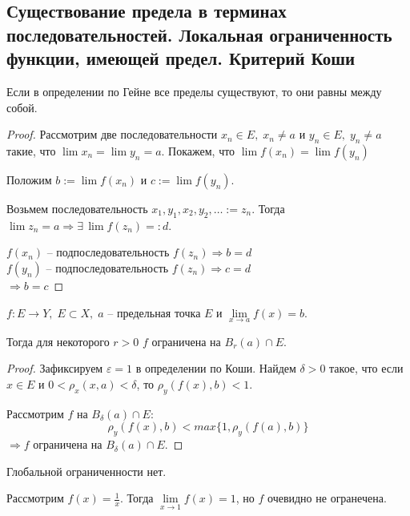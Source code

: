 \subsection{Существование предела в терминах последовательностей. Локальная ограниченность функции, имеющей предел. Критерий Коши \href{https://youtu.be/BiTNBigkkyU?t=2205}{\Walley}}

\begin{theorem-non}
    Если в определении по Гейне все пределы существуют, то они равны между собой. 
\end{theorem-non}
\begin{proof}
    Рассмотрим две последовательности $x_n \in E, \; x_n \neq a$ и $y_n \in E, \; y_n \neq a$ такие, что $\lim x_n = \lim y_n = a$. Покажем, что $\lim f(x_n) = \lim f(y_n)$
    
    Положим $b := \lim f(x_n)$ и $c := \lim f(y_n)$.

    Возьмем последовательность $x_1, y_1, x_2, y_2, \dots := z_n$. Тогда $\lim z_n = a \Rightarrow \exists \, \lim f(z_n) =: d$.
    
    $f(x_n)$ -- подпоследовательность $f(z_n) \Rightarrow b = d$ \\
    $f(y_n)$ -- подпоследовательность $f(z_n) \Rightarrow c = d$ \\
    $\Rightarrow b = c$
\end{proof}

\begin{theorem-non}
    $f : E \to Y, \; E \subset X, \; a$ -- предельная точка $E$ и $\lim\limits_{x \to a} f(x) = b$. 

    Тогда для некоторого $r > 0$ $f$ ограничена на $B_r(a) \cap E$. 
\end{theorem-non}
\begin{proof}
    Зафиксируем $\varepsilon = 1$ в определении по Коши. Найдем $\delta > 0$ такое, что если $x \in E$ и $0 < \rho_x(x, a) < \delta$, то $\rho_y(f(x), b) < 1$.

    Рассмотрим $f$ на $B_{\delta}(a) \cap E$:
    \[ \rho_y(f(x), b) < max \{1, \rho_y(f(a), b)\} \]
    $\Rightarrow f$ ограничена на $B_{\delta}(a) \cap E$.
\end{proof}
\begin{notice}
    Глобальной ограниченности нет. 

    Рассмотрим $f(x) = \frac{1}{x}$. Тогда $\lim\limits_{x \to 1} f(x) = 1$, но $f$ очевидно не огранечена.
\end{notice}

\vspace{7mm}

